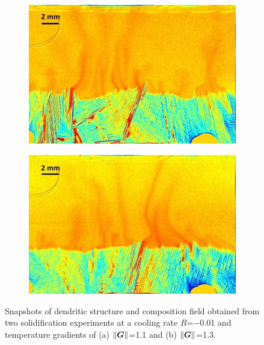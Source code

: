 \begin{figure}[htbp]
\centering
  \begin{subfigure}{0.4\textwidth}
    \centering
	\includegraphics[width=\textwidth]{Chapter4/Graphics/freckle_exp/lowgrad.png}
	\caption{}
    \label{fig:exp_lowgrad}
  \end{subfigure}
  \begin{subfigure}{0.4\textwidth}
    \centering
	\includegraphics[width=\textwidth]{Chapter4/Graphics/freckle_exp/highgrad.png}
	\caption{}
    \label{fig:exp_highgrad}
  \end{subfigure}
\captionsetup{singlelinecheck=off}
\caption[.]{Snapshots of dendritic structure and composition field 
obtained from two solidification experiments at a cooling rate 
$R$=\SI{-0.01}{\uCR} and temperature gradients of (a) $\lVert \boldsymbol{G} \rVert$=\SI{1.1}{\ugradT} and (b) $\lVert \boldsymbol{G} \rVert$=\SI{1.3}{\ugradT}.} 
\label{fig:experimental_freckles_gradients}
\end{figure}



